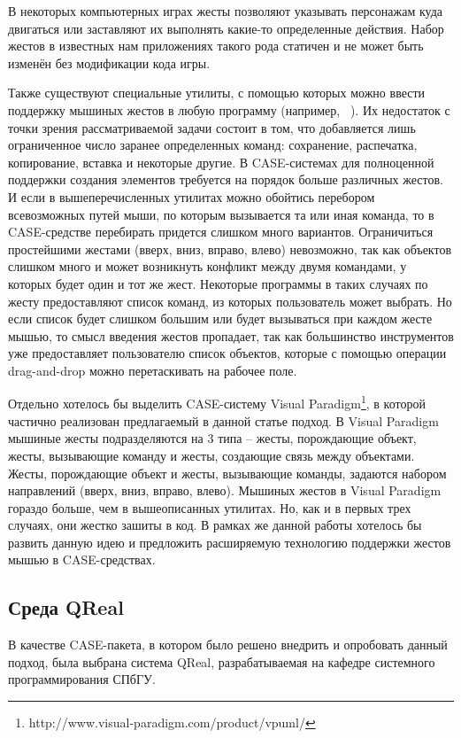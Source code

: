 \documentclass[a5paper]{article}
\begin{document}
В некоторых компьютерных играх жесты позволяют указывать персонажам куда двигаться или заставляют их выполнять какие-то определенные
действия. Набор жестов в известных нам приложениях такого рода статичен и не может быть изменён без модификации кода игры.

Также существуют специальные утилиты, с помощью которых можно ввести поддержку мышиных жестов в любую программу 
(например, ~\cite{strokeIt, gMote, xstroke, flyGesture}).
Их недостаток с точки зрения рассматриваемой задачи состоит в том, что добавляется лишь ограниченное число заранее определенных команд: 
сохранение, распечатка, копирование, вставка и некоторые другие. В CASE-системах для полноценной поддержки создания элементов требуется на порядок больше различных жестов. И если в
вышеперечисленных утилитах можно обойтись перебором всевозможных путей мыши, по которым вызывается та или иная команда, то в CASE-средстве 
перебирать придется слишком много вариантов. Ограничиться простейшими жестами (вверх, вниз, вправо, влево) невозможно, так как 
объектов слишком много и может возникнуть конфликт между двумя командами, у которых будет один и тот же жест. Некоторые программы 
в таких случаях по жесту предоставляют список команд, из которых пользователь может выбрать. Но если список будет слишком большим или 
будет вызываться при каждом жесте мышью, то смысл введения жестов пропадает, так как большинство инструментов уже 
предоставляет пользователю список объектов, которые с помощью операции drag-and-drop можно перетаскивать на рабочее поле.

Отдельно хотелось бы выделить CASE-систему Visual Paradigm\footnote{http://www.visual-paradigm.com/product/vpuml/}, в которой частично реализован предлагаемый в данной статье подход. 
В Visual Paradigm мышиные жесты подразделяются на 3 типа – жесты, порождающие объект, жесты, вызывающие команду и жесты, 
создающие связь между объектами. Жесты, порождающие объект и жесты, вызывающие команды, задаются набором направлений (вверх, вниз, вправо, влево). 
Мышиных жестов в Visual Paradigm гораздо больше, чем в вышеописанных утилитах. Но, как и в первых трех случаях, они жестко
зашиты в код. В рамках же данной работы хотелось бы развить данную идею и предложить расширяемую технологию поддержки
жестов мышью в CASE-средствах.

\subsection{Среда QReal}
В качестве CASE-пакета, в котором было решено внедрить и опробовать данный подход, была выбрана система QReal, разрабатываемая на кафедре 
системного программирования СПбГУ. 
\end{document}
